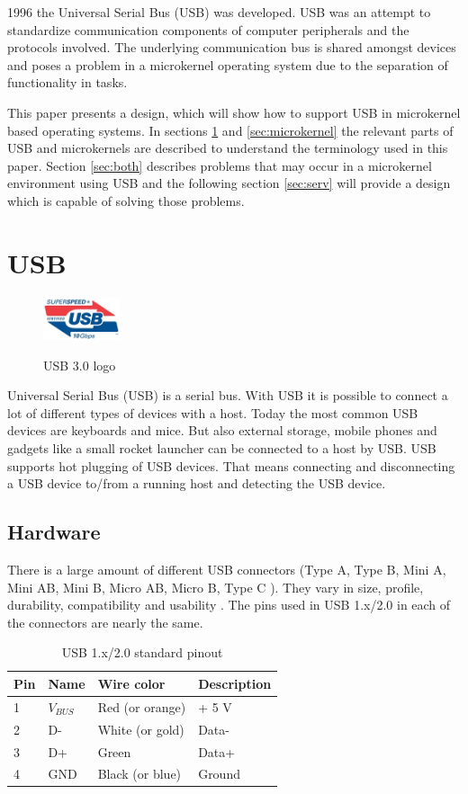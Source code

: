 \documentclass{acm_proc_article-sp}
\begin{document}
1996 the Universal Serial Bus (USB) was developed.
USB was an attempt to standardize communication components of computer peripherals and
the protocols involved.
The underlying communication bus is shared amongst devices and poses a problem in a microkernel
operating system due to the separation of functionality in tasks.

This paper presents a design, which will show how to support USB in microkernel based operating systems.
In sections \ref{sec:usb} and \ref{sec:microkernel} the relevant parts of USB and microkernels are described
to understand the terminology used in this paper.
Section \ref{sec:both} describes problems that may occur in a microkernel environment using USB and the following
section \ref{sec:serv} will provide a design which is capable of solving those problems.

\section{USB}
\label{sec:usb}
\begin{figure}
\centering
\includegraphics[width=0.2\textwidth]{usblogo.jpg}
\label{fig:usblogo}
\caption{USB 3.0 logo \cite{usborg}}
\end{figure}
Universal Serial Bus (USB) is a serial bus.
With USB it is possible to connect a lot of different types of devices with a host.
Today the most common USB devices are keyboards and mice.
But also external storage, mobile phones and gadgets like a small rocket launcher can be connected to a host by USB.
USB supports hot plugging of USB devices.
That means connecting and disconnecting a USB device to/from a running host and detecting the USB device.

\subsection{Hardware}
There is a large amount of different USB connectors (Type A, Type B, Mini A, Mini AB, Mini B, Micro AB, Micro B, Type C \cite{usborg}).
They vary in size, profile, durability, compatibility and usability \cite{dowell}.
The pins used in USB 1.x/2.0 in each of the connectors are nearly the same.

\begin{table}
\centering
\caption{USB 1.x/2.0 standard pinout}
\begin{tabular}{|l|l|l|l|} \hline
Pin & Name & Wire color & Description\\ \hline
1 & $V_{BUS}$ & Red (or orange) & + 5 V\\ \hline
2 & D- & White (or gold) & Data-\\ \hline
3 & D+ & Green & Data+\\ \hline
4 & GND & Black (or blue) & Ground\\ \hline
\end{tabular}
\end{table}
\end{document}
